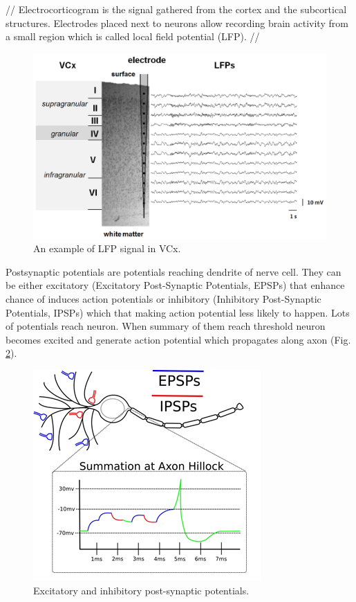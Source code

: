 \documentclass{pracalicmgr}
\begin{document}
        // Electrocorticogram is the signal gathered from the cortex and the subcortical structures. Electrodes placed next to neurons allow recording brain activity from a small region which is called local field potential (LFP). //
        \begin{figure}[htbp]
        	\begin{center}
        		\includegraphics[scale=0.5]{VCx_LFPs2.png}
        	\end{center}
        	\caption{ An example of LFP signal in VCx.}
        	\label{rys:VCx_LFPs}
        \end{figure} 
        
        Postsynaptic potentials are potentials reaching dendrite of nerve cell. They can be either excitatory (Excitatory Post-Synaptic Potentials, EPSPs) that enhance chance of induces action potentials or inhibitory (Inhibitory Post-Synaptic Potentials, IPSPs) which that making action potential less likely to happen. Lots of potentials reach neuron. When summary of them reach threshold neuron becomes excited and generate action potential which propagates along axon (Fig. \ref{rys:PSPs}).
        \begin{figure}[htbp]
        	\begin{center}
        		\includegraphics[scale=1]{PSPs.png}
        	\end{center}
        	\caption{Excitatory and inhibitory post-synaptic potentials.}
        	\label{rys:PSPs}
        \end{figure} 
        
\end{document}
